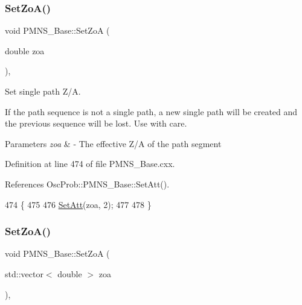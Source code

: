 \subsubsection{\texorpdfstring{Set\+Zo\+A()}{SetZoA()}\hspace{0.1cm}{\footnotesize\ttfamily [1/2]}}
{\footnotesize\ttfamily void P\+M\+N\+S\+\_\+\+Base\+::\+Set\+ZoA (\begin{DoxyParamCaption}\item[{double}]{zoa }\end{DoxyParamCaption})\hspace{0.3cm}{\ttfamily [virtual]}, {\ttfamily [inherited]}}

Set single path Z/A.

If the path sequence is not a single path, a new single path will be created and the previous sequence will be lost. Use with care.


\begin{DoxyParams}{Parameters}
{\em zoa} & -\/ The effective Z/A of the path segment \\
\hline
\end{DoxyParams}


Definition at line 474 of file P\+M\+N\+S\+\_\+\+Base.\+cxx.



References Osc\+Prob\+::\+P\+M\+N\+S\+\_\+\+Base\+::\+Set\+Att().


\begin{DoxyCode}
474                                 \{
475 
476   \hyperlink{classOscProb_1_1PMNS__Base_aba565962a440d14bee7a2a96d2eca2c5}{SetAtt}(zoa, 2);
477 
478 \}
\end{DoxyCode}
\mbox{\label{classOscProb_1_1PMNS__Base_a8495f8a320e1a21965e6a64aec92ad2a}} 
\subsubsection{\texorpdfstring{Set\+Zo\+A()}{SetZoA()}\hspace{0.1cm}{\footnotesize\ttfamily [2/2]}}
{\footnotesize\ttfamily void P\+M\+N\+S\+\_\+\+Base\+::\+Set\+ZoA (\begin{DoxyParamCaption}\item[{std\+::vector$<$ double $>$}]{zoa }\end{DoxyParamCaption})\hspace{0.3cm}{\ttfamily [virtual]}, {\ttfamily [inherited]}}

